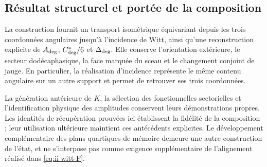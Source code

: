 \subsection{Résultat structurel et portée de la composition}

La construction fournit un transport isométrique équivariant depuis
les trois coordonnées angulaires jusqu’à l’incidence de Witt, ainsi qu’une
reconstruction explicite de \(A_{\rm deg}\), \(C^*_{\rm deg}/6\) et
\(\Delta_{\rm deg}\). Elle conserve l’orientation extérieure, le secteur
dodécaphasique, la face marquée du sceau et le changement conjoint de jauge.
En particulier, la réalisation d’incidence représente le même contenu
angulaire sur un autre support et permet de retrouver ses trois coordonnées.

La génération antérieure de \(K\), la sélection des fonctionnelles
sectorielles et l’identification physique des amplitudes conservent leurs
démonstrations propres. Les identités de récupération prouvées ici
établissent la fidélité de la composition ; leur utilisation ultérieure maintient
ces antécédents explicites. Le développement complémentaire des plans
quartiques de mémoire demeure une autre construction de l’état, et ne
s’interpose pas comme exigence supplémentaire de l’alignement réalisé dans
\eqref{eq:ii-witt-F}.
